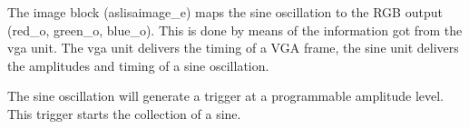 The image block (aslisaimage\_e) maps the sine oscillation to the RGB output (red\_o, green\_o, blue\_o). This is done by means of the information got from the vga unit. The vga unit delivers the timing of a VGA frame, the sine unit delivers the amplitudes and timing of a sine oscillation.

The sine oscillation will generate a trigger at a programmable amplitude level. This trigger starts the collection of a sine.
